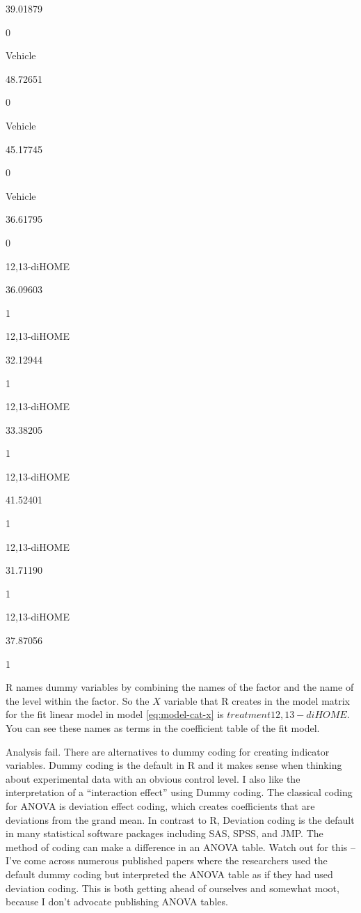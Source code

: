 \documentclass[]{book}
\begin{document}
39.01879

0

Vehicle

48.72651

0

Vehicle

45.17745

0

Vehicle

36.61795

0

12,13-diHOME

36.09603

1

12,13-diHOME

32.12944

1

12,13-diHOME

33.38205

1

12,13-diHOME

41.52401

1

12,13-diHOME

31.71190

1

12,13-diHOME

37.87056

1

R names dummy variables by combining the names of the factor and the name of the level within the factor. So the \(X\) variable that R creates in the model matrix for the fit linear model in model \eqref{eq:model-cat-x} is \(treatment12,13-diHOME\). You can see these names as terms in the coefficient table of the fit model.

Analysis fail. There are alternatives to dummy coding for creating indicator variables. Dummy coding is the default in R and it makes sense when thinking about experimental data with an obvious control level. I also like the interpretation of a ``interaction effect'' using Dummy coding. The classical coding for ANOVA is deviation effect coding, which creates coefficients that are deviations from the grand mean. In contrast to R, Deviation coding is the default in many statistical software packages including SAS, SPSS, and JMP. The method of coding can make a difference in an ANOVA table. Watch out for this -- I've come across numerous published papers where the researchers used the default dummy coding but interpreted the ANOVA table as if they had used deviation coding. This is both getting ahead of ourselves and somewhat moot, because I don't advocate publishing ANOVA tables.
\end{document}
